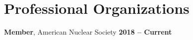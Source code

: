 \section{\mysidestyle Professional Organizations}
\textbf{Member}, American Nuclear Society \hfill \textbf{2018 -- Current} \\